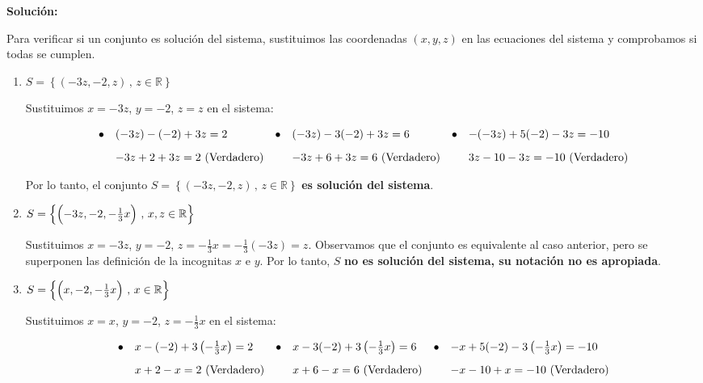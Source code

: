 \documentclass[11pt]{article}
\begin{document}
\begin{enumerate}[\hspace{-5mm} 1) ]
 
 { \bf Solución: }

Para verificar si un conjunto es solución del sistema, sustituimos las coordenadas \((x, y, z)\) en las ecuaciones del sistema y comprobamos si todas se cumplen.

\begin{enumerate}
\item  $S = \left\{ \left(-3z, -2, z\right) \, ,\, z \in \mathbb{R}\right\}$

\medskip


Sustituimos \(x = -3z\), \(y = -2\), \(z = z\) en el sistema:


\medskip

\[
\begin{array}{rl rl rl }
\bullet & (-3z) - (-2) + 3z = 2 
&
\bullet &  (-3z) - 3(-2) + 3z = 6 
&
\bullet &   -(-3z) + 5(-2) - 3z = -10 
\\[3mm]
   &  -3z + 2 + 3z = 2 \  \text{(Verdadero)} 
   &
   &   -3z + 6 + 3z = 6 \  \text{(Verdadero)} 
   &
   &   3z - 10 - 3z = -10 \  \text{(Verdadero)}
\end{array}
\]

Por lo tanto, el conjunto \(S = \left\{ \left(-3z, -2, z\right) \, ,\, z \in \mathbb{R}\right\}\) \textbf{es solución del sistema}.


\bigskip 
\bigskip
\bigskip 



\item  $S = \left\{\left(-3z, -2, -\tfrac{1}{3}x \rule{0mm}{4mm}\right) \, ,\, x, z \in \mathbb{R}\right\}$ 

\bigskip


Sustituimos \(x = -3z\), \(y = -2\), \(z = -\frac{1}{3}x = -\frac{1}{3}(-3z) = z\). Observamos que el conjunto es equivalente al caso anterior, pero se superponen las definición de la incognitas $x$ e $y$. Por lo tanto, \(S\) \textbf{ no es solución del sistema,  su notación no es apropiada}.



\bigskip 

\item  $S = \left\{\left( x, -2, -\tfrac{1}{3}x \rule{0mm}{4mm}\right) \, ,\, x \in \mathbb{R}\right\}$

\medskip


Sustituimos \(x = x\), \(y = -2\), \(z = -\frac{1}{3}x\) en el sistema:

\medskip


\[
\begin{array}{rl rl rl }
\bullet &   x - (-2) + 3\left(-\frac{1}{3}x\right) = 2 
&
\bullet &   x - 3(-2) + 3\left(-\frac{1}{3}x\right) = 6 
& \bullet &   -x + 5(-2) - 3\left(-\frac{1}{3}x\right) = -10 
\\[3mm]
   &  x + 2 - x = 2 \  \text{(Verdadero)} 
   &
   &  x + 6 - x = 6 \  \text{(Verdadero)} 
   &
   & -x - 10 + x = -10 \  \text{(Verdadero)}
\end{array}
\]


\end{enumerate}
\end{enumerate}
\end{document}
